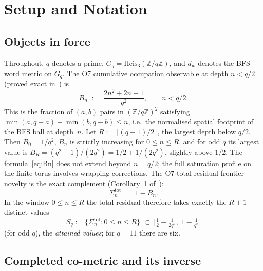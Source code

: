 \documentclass[11pt,a4paper]{article}
\begin{document}
  \section{Setup and Notation}\label{sec:setup}

    \subsection{Objects in force}\label{sec:objects}

      Throughout, $q$ denotes a prime, $G_q = \mathrm{Heis}_3(\mathbb{Z}/q\mathbb{Z})$,
      and $d_w$ denotes the BFS word metric on $G_q$.
      The O7 cumulative occupation observable at depth $n < q/2$ (proved exact
      in~\cite{Beau2026n}) is
      \begin{equation}\label{eq:Bn}
        B_n \;:=\; \frac{2n^2+2n+1}{q^2}, \qquad n < q/2.
      \end{equation}
      This is the fraction of $(a,b)$ pairs in $({\mathbb{Z}/q\mathbb{Z}})^2$ satisfying
      $\min(a,q{-}a)+\min(b,q{-}b)\leq n$, i.e.\ the normalised spatial footprint of the BFS
      ball at depth~$n$.
      Let $R := \lfloor (q-1)/2 \rfloor$, the largest depth below $q/2$.
      Then $B_0 = 1/q^2$, $B_n$ is strictly increasing for $0 \le n \le R$, and for odd $q$ its largest value is
      $B_R = (q^2+1)/(2q^2) = 1/2 + 1/(2q^2)$, slightly above $1/2$.
      The formula~\eqref{eq:Bn} does not extend beyond $n = q/2$; the full saturation profile
      on the finite torus involves wrapping corrections.
      The O7 total residual frontier novelty is the exact complement (Corollary~1
      of~\cite{Beau2026n}):
      \begin{equation}\label{eq:Sigma}
        \Sigma_n^{\mathrm{tot}} \;=\; 1 - B_n.
      \end{equation}
      In the window $0 \le n \le R$ the total residual therefore takes exactly the $R+1$ distinct values
      \[
        S_q := \{\Sigma_n^{\mathrm{tot}} : 0 \le n \le R\}
        \;\subset\; \bigl[\tfrac12 - \tfrac{1}{2q^2},\; 1 - \tfrac{1}{q^2}\bigr]
      \]
      (for odd $q$), the \emph{attained values}; for $q = 11$ there are six.

    \subsection{Completed co-metric and its inverse}\label{sec:cometric}
\end{document}
